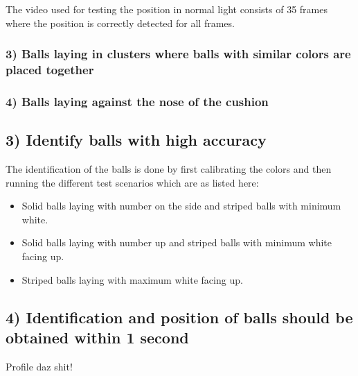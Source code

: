 The video used for testing the position in normal light consists of 35 frames where the position is correctly detected for all frames.

\subsubsection{ 3) Balls laying in clusters where balls with similar colors are placed together}


\subsubsection{ 4) Balls laying against the nose of the cushion}


\subsection{3) Identify balls with high accuracy}

The identification of the balls is done by first calibrating the colors and then running the different test scenarios which are as listed here:

\begin{itemize}
\setlength{\itemsep}{0mm}
	\item Solid balls laying with number on the side and striped balls with minimum white.\\
	\item Solid balls laying with number up and striped balls with minimum white facing up.\\
	\item Striped balls laying with maximum white facing up.\\	
\end{itemize}


\subsection{4) Identification and position of balls should be obtained within 1 second}

Profile daz shit!
